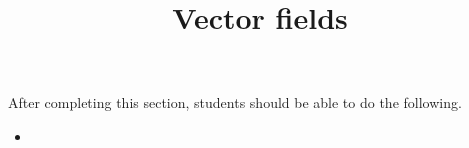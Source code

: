 \documentclass{ximera}
\title{Vector fields}
\begin{document}
\begin{abstract}
\end{abstract}
\maketitle

\begin{sectionOutcomes}

After completing this section, students should be able to do the following.

\begin{itemize}
\item 
\end{itemize}

\end{sectionOutcomes}
\end{document}
